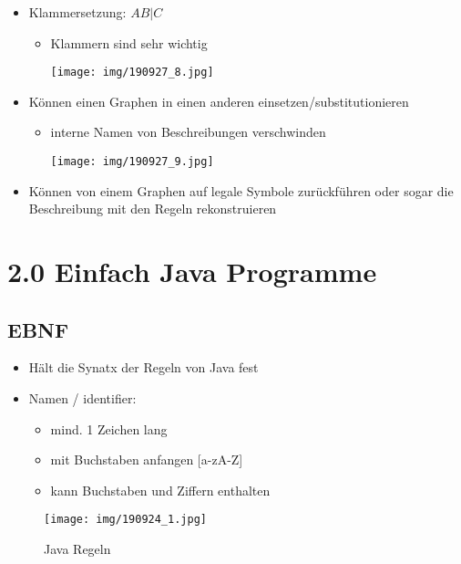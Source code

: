 \documentclass[11pt]{article}
\begin{document}
\begin{itemize}
\item Klammersetzung: \(A B | C\)\\
\begin{itemize}
\item Klammern sind sehr wichtig\\
\begin{center}
\texttt{[image: img/190927\_8.jpg]}
\end{center}
\end{itemize}
\item Können einen Graphen in einen anderen einsetzen/substitutionieren\\
\begin{itemize}
\item interne Namen von Beschreibungen verschwinden\\
\begin{center}
\texttt{[image: img/190927\_9.jpg]}
\end{center}
\end{itemize}
\item Können von einem Graphen auf legale Symbole zurückführen oder sogar die Beschreibung mit den Regeln rekonstruieren\\
\end{itemize}


\section{2.0 Einfach Java Programme}
\label{sec:org7475015}
\subsection{EBNF}
\label{sec:org36aece4}
\begin{itemize}
\item Hält die Synatx der Regeln von Java fest\\
\item Namen / identifier:\\
\begin{itemize}
\item mind. 1 Zeichen lang\\
\item mit Buchstaben anfangen [a-zA-Z]\\
\item kann Buchstaben und Ziffern enthalten\\
\end{itemize}
\end{itemize}
\begin{figure}[htbp]
\centering
\texttt{[image: img/190924\_1.jpg]}
\caption{Java Regeln}
\end{figure}
\end{document}
